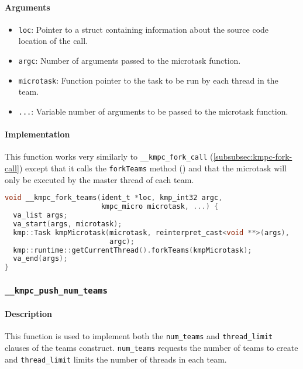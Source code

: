 \paragraph{Arguments}
\begin{itemize}
	\item \texttt{loc}: Pointer to a struct containing information about the source code location
	      of the call.
	\item \texttt{argc}: Number of arguments passed to the microtask function.
	\item \texttt{microtask}: Function pointer to the task to be run by each thread in the team.
	\item \texttt{...}: Variable number of arguments to be passed to the microtask function.
\end{itemize}

\paragraph{Implementation} This function works very similarly to \texttt{__kmpc_fork_call}
(\cref{subsubsec:kmpc-fork-call}) except that it calls the \texttt{forkTeams} method ()
and that the microtask will only be executed by the master thread of each team.

\begin{lstlisting}[language=C, caption={__kmpc_fork_teams}, label={lst:kmpc-fork-teams}, escapechar=@]
void __kmpc_fork_teams(ident_t *loc, kmp_int32 argc,
                       kmpc_micro microtask, ...) {
  va_list args;
  va_start(args, microtask);
  kmp::Task kmpMicrotask(microtask, reinterpret_cast<void **>(args),
                         argc);
  kmp::runtime::getCurrentThread().forkTeams(kmpMicrotask);
  va_end(args);
}
\end{lstlisting}

\subsubsection{\texttt{__kmpc_push_num_teams}}
\label{subsubsec:kmpc-push-num-teams}

\paragraph{Description} This function is used to implement both the \texttt{num_teams} and
\texttt{thread_limit} clauses of the teams construct. \texttt{num\_teams} requests the number of
teams to create and \texttt{thread\_limit} limits the number of threads in each team.

